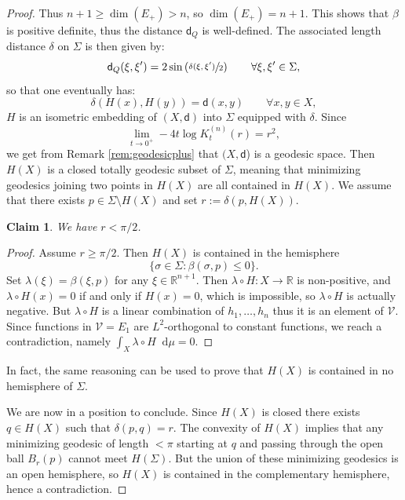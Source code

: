 \documentclass[JEP,XML,SOM,Unicode,published]{cedram}
\let\backslash\setminus
\theoremstyle{plain}
\newtheorem{claim}[theorem]{Claim}
\theoremstyle{definition}
\newcommand{\setR}{\mathbb{R}}
\newcommand{\cV}{\mathcal{V}}
\newcommand{\di}{\mathop{}\!\mathrm{d}}
\newcommand{\dist}{\mathsf{d}}
\begin{document}
\begin{proof}
Thus $n+1 \ge \dim(E_+)> n$, so $\dim(E_+)=n+1$. This shows that $\beta$ is positive definite, thus the distance $\dist_Q$ is well-defined. The associated length distance $\delta$ on $\Sigma$ is then given by:
\[
\dist_Q(\xi,\xi') = 2 \sin\left(\sfrac{\delta(\xi,\xi')}{2} \right) \qquad \forall \xi, \xi' \in \Sigma,
\]
so that one eventually has:
\[
\delta(H(x),H(y)) = \dist(x,y) \qquad \forall x,y \in X,
\]
\ie $H$ is an isometric embedding of $(X,\dist)$ into $\Sigma$ equipped with $\delta$.
Since
\[
\lim_{t\to 0^+} -4t \log K_t^{(n)}(r)=r^2,
\]
we get from Remark \ref{rem:geodesicplus} that
$(X,\dist$) is a geodesic space. Then $H(X)$ is a closed totally geodesic subset of $\Sigma$, meaning that minimizing geodesics joining two points in $H(X)$ are all contained in $H(X)$. We assume that there exists $p \in \Sigma \backslash H(X)$ and set $r:=\delta(p,H(X))$.

\begin{claim}
We have $r< \pi/2$.
\end{claim}

\begin{proof}
Assume $r\ge \pi/2$. Then $H(X)$ is contained in the hemisphere
\[
\{\sigma \in \Sigma: \beta(\sigma,p)\le 0\}.
\]
Set $\lambda(\xi)=\beta(\xi,p)$ for any $\xi \in \setR^{n+1}$. Then $\lambda \circ H:X\to\setR$ is non-positive, and $\lambda \circ H(x)=0$ if and only if $H(x)=0$, which is impossible, so $\lambda \circ H$ is actually negative. But $\lambda \circ H$ is a linear combination of $h_1,\ldots,h_n$ thus it is an element of $\cV$. Since functions in $\cV = E_1$ are $L^2$-orthogonal to constant functions, we reach a contradiction, namely $\int_X \lambda \circ H \di \mu = 0$.
\end{proof}

In fact, the same reasoning can be used to prove that $H(X)$ is contained in no hemisphere of $\Sigma$.

We are now in a position to conclude. Since $H(X)$ is closed there exists $q\in H(X)$ such that $\delta(p,q)=r$. The convexity of $H(X)$ implies that any minimizing geodesic of length $<\pi$ starting at $q$ and passing through the open ball $B_r(p)$ cannot meet $H(\Sigma)$. But the union of these minimizing geodesics is an open hemisphere, so $H(X)$ is contained in the complementary hemisphere, hence a contradiction.
\end{proof}




\end{document}
